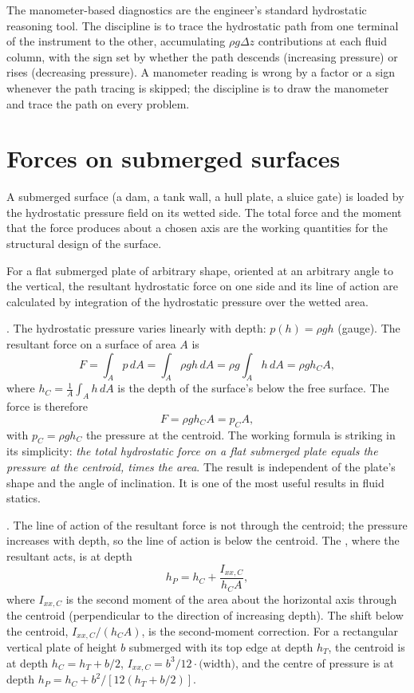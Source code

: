 The manometer-based diagnostics are the engineer's standard
hydrostatic reasoning tool. The discipline is to trace the
hydrostatic path from one terminal of the instrument to the
other, accumulating $\rho g \Delta z$ contributions at each
fluid column, with the sign set by whether the path descends
(increasing pressure) or rises (decreasing pressure). A manometer
reading is wrong by a factor or a sign whenever the path tracing
is skipped; the discipline is to draw the manometer and trace the
path on every problem.

\section{Forces on submerged surfaces}

A submerged surface (a dam, a tank wall, a hull plate, a
sluice gate) is loaded by the hydrostatic pressure field on its
wetted side. The total force and the moment that the force
produces about a chosen axis are the working quantities for the
structural design of the surface.

For a flat submerged plate of arbitrary shape, oriented at an
arbitrary angle to the vertical, the resultant hydrostatic force
on one side and its line of action are calculated by integration
of the hydrostatic pressure over the wetted area.

. The
hydrostatic pressure varies linearly with depth: $p(h) = \rho g h$
(gauge). The resultant force on a surface of area $A$ is
\[
F = \int_A p \,dA = \int_A \rho g h \,dA = \rho g \int_A h \,dA
= \rho g h_C A,
\]
where $h_C = \frac{1}{A}\int_A h\,dA$ is the depth of the surface's
 below the free surface. The force is therefore
\[
F = \rho g h_C A = p_C A,
\]
with $p_C = \rho g h_C$ the pressure at the centroid. The
working formula is striking in its simplicity: \emph{the total
hydrostatic force on a flat submerged plate equals the pressure
at the centroid, times the area}. The result is independent of
the plate's shape and the angle of inclination. It is one of the
most useful results in fluid statics.



. The line of
action of the resultant force is not through the centroid; the
pressure increases with depth, so the line of action is below
the centroid. The , where the
resultant acts, is at depth
\[
h_P = h_C + \frac{I_{xx,C}}{h_C A},
\]
where $I_{xx,C}$ is the second moment of the area about the
horizontal axis through the centroid (perpendicular to the
direction of increasing depth). The shift below the centroid,
$I_{xx,C}/(h_C A)$, is the second-moment correction. For a
rectangular vertical plate of height $b$ submerged with its top
edge at depth $h_T$, the centroid is at depth $h_C = h_T + b/2$,
$I_{xx,C} = b^3/12 \cdot \text{(width)}$, and the centre of
pressure is at depth $h_P = h_C + b^2/[12(h_T + b/2)]$.

